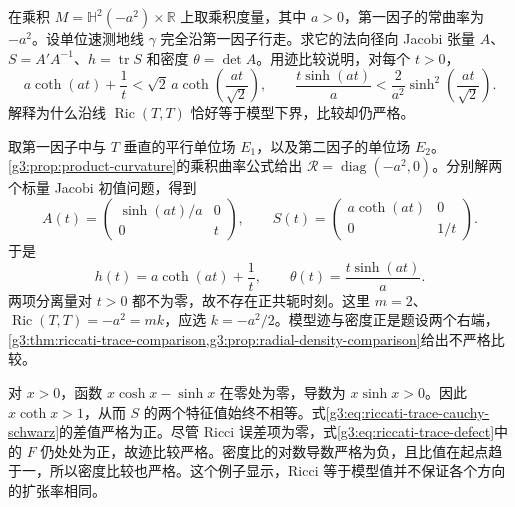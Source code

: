 \begin{exercise}\label{g3:ex:product-strict-trace-comparison}
	在乘积 \(M=\mathbb H^2(-a^2)\times\mathbb R\) 上取乘积度量，其中 \(a>0\)，第一因子的常曲率为 \(-a^2\)。设单位速测地线 \(\gamma\) 完全沿第一因子行走。求它的法向径向 Jacobi 张量 \(A\)、\(S=A'A^{-1}\)、\(h=\operatorname{tr}S\) 和密度 \(\theta=\det A\)。用迹比较说明，对每个 \(t>0\)，
	\[
		a\coth(at)+\frac1t<\sqrt2\,a\coth\left(\frac{at}{\sqrt2}\right),
		\qquad
		\frac{t\sinh(at)}a<\frac2{a^2}\sinh^2\left(\frac{at}{\sqrt2}\right).
	\]
	解释为什么沿线 \(\operatorname{Ric}(T,T)\) 恰好等于模型下界，比较却仍严格。
\end{exercise}
\begin{solution}
	取第一因子中与 \(T\) 垂直的平行单位场 \(E_1\)，以及第二因子的单位场 \(E_2\)。\cref{g3:prop:product-curvature}的乘积曲率公式给出
	\(\mathcal R=\operatorname{diag}(-a^2,0)\)。分别解两个标量 Jacobi 初值问题，得到
	\[
		A(t)=\begin{pmatrix}\sinh(at)/a&0\\0&t\end{pmatrix},\qquad
		S(t)=\begin{pmatrix}a\coth(at)&0\\0&1/t\end{pmatrix}.
	\]
	于是
	\[
		h(t)=a\coth(at)+\frac1t,\qquad
		\theta(t)=\frac{t\sinh(at)}a.
	\]
	两项分离量对 \(t>0\) 都不为零，故不存在正共轭时刻。这里 \(m=2\)、\(\operatorname{Ric}(T,T)=-a^2=mk\)，应选 \(k=-a^2/2\)。模型迹与密度正是题设两个右端，\cref{g3:thm:riccati-trace-comparison,g3:prop:radial-density-comparison}给出不严格比较。

	对 \(x>0\)，函数 \(x\cosh x-\sinh x\) 在零处为零，导数为 \(x\sinh x>0\)。因此 \(x\coth x>1\)，从而 \(S\) 的两个特征值始终不相等。式\eqref{g3:eq:riccati-trace-cauchy-schwarz}的差值严格为正。尽管 Ricci 误差项为零，式\eqref{g3:eq:riccati-trace-defect}中的 \(F\) 仍处处为正，故迹比较严格。密度比的对数导数严格为负，且比值在起点趋于一，所以密度比较也严格。这个例子显示，Ricci 等于模型值并不保证各个方向的扩张率相同。
\end{solution}

